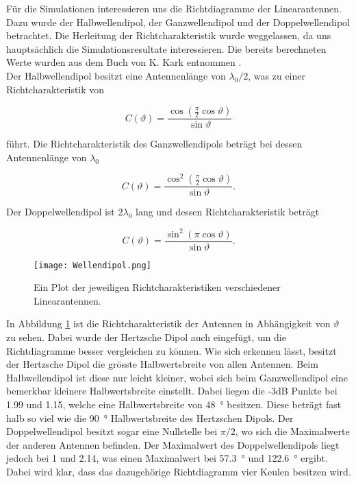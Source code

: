 Für die Simulationen interessieren uns die Richtdiagramme der Linearantennen. Dazu wurde der Halbwellendipol, der Ganzwellendipol und der Doppelwellendipol betrachtet. Die Herleitung der Richtcharakteristik wurde weggelassen, da uns hauptsächlich die Simulationsresultate interessieren. Die bereits berechneten Werte wurden aus dem Buch von K. Kark entnommen \cite{book}.\\

Der Halbwellendipol besitzt eine Antennenlänge von $\lambda_0/2$, was zu einer Richtcharakteristik von 

\begin{equation}\label{eq:RichtHalb}
C(\vartheta) = \frac{\cos \left(\frac{\pi}{2}\cos \vartheta \right)}{\sin \vartheta}
\end{equation}

führt. Die Richtcharakteristik des Ganzwellendipols beträgt bei dessen Antennenlänge von $\lambda_0$

\begin{equation}
C(\vartheta) = \frac{\cos^2 \left(\frac{\pi}{2}\cos \vartheta \right)}{\sin \vartheta}.
\end{equation}

Der Doppelwellendipol ist $2\lambda_0$ lang und dessen Richtcharakteristik beträgt

\begin{equation}\label{eq:RichtDoppel}
C(\vartheta) = \frac{\sin^2 \left(\pi \cos \vartheta \right)}{\sin \vartheta}.
\end{equation}

\begin{figure}[!ht]
	\centering
    \texttt{[image: Wellendipol.png]}
    \caption{Ein Plot der jeweiligen Richtcharakteristiken verschiedener Linearantennen.}
    \label{fig:Wellendipol}
\end{figure}

In Abbildung \ref{fig:Wellendipol} ist die Richtcharakteristik der Antennen in Abhängigkeit von $\vartheta$ zu sehen. Dabei wurde der Hertzsche Dipol auch eingefügt, um die Richtdiagramme besser vergleichen zu können. Wie sich erkennen lässt, besitzt der Hertzsche Dipol die grösste Halbwertsbreite von allen Antennen. Beim Halbwellendipol ist diese nur leicht kleiner, wobei sich beim Ganzwellendipol eine bemerkbar kleinere Halbwertsbreite einstellt. Dabei liegen die -3dB Punkte bei \num{1.99} und \num{1.15}, welche eine Halbwertsbreite von \SI{48}{\degree} besitzen. Diese beträgt fast halb so viel wie die \SI{90}{\degree} Halbwertsbreite des Hertzschen Dipols. Der Doppelwellendipol besitzt sogar eine Nullstelle bei $\pi/2$, wo sich die Maximalwerte der anderen Antennen befinden. Der Maximalwert des Doppelwellendipols liegt jedoch bei \num{1} und \num{2.14}, was einen Maximalwert bei \SI{57.3}{\degree} und \SI{122.6}{\degree} ergibt. Dabei wird klar, dass das dazugehörige Richtdiagramm vier Keulen besitzen wird.\\

